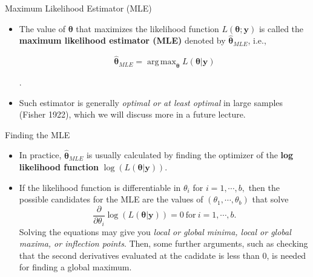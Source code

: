 \documentclass{beamer}
\DeclareMathOperator*{\argmax}{arg\,max}
\begin{document}
    \begin{frame}{Maximum Likelihood Estimator (MLE)}
        \begin{itemize}
            \item The value of $\boldsymbol{\theta}$ that maximizes the likelihood function $L(\boldsymbol{\theta}; \boldsymbol{y})$ is called the {\bf maximum likelihood estimator (MLE)} denoted by $\hat{\boldsymbol{\theta}}_{MLE}$, i.e.,
            
            $$\hat{\boldsymbol{\theta}}_{MLE} = \argmax_{\boldsymbol{\theta}} L(\boldsymbol{\theta}| \boldsymbol{y})$$
            
            .
            \item Such estimator is generally {\it optimal or at least optimal} in large samples (Fisher 1922), which we will discuss more in a future lecture.
        \end{itemize}
    \end{frame}
    
    \begin{frame}{Finding the MLE}
        \begin{itemize}
            \item In practice, $\hat{\boldsymbol{\theta}}_{MLE}$ is usually calculated by finding the optimizer of the {\bf log likelihood function} $\log(L(\boldsymbol{\theta}| \boldsymbol{y})).$
            
            \item If the likelihood function is differentiable in $\theta_{i}$ for $i = 1, \cdots, b,$  then the possible candidates for the MLE are the values of $(\theta_{1}, \cdots, \theta_{b})$ that solve 
             $$ \frac{\partial}{\partial \theta_{i}} \log(L(\boldsymbol{\theta}| \boldsymbol{y})) = 0\ \mbox{for}\ i = 1, \cdots, b.$$
             Solving the equations may give you {\it local or global minima, local or global maxima, or inflection points}. Then, some further arguments, such as checking that the second derivatives evaluated at the cadidate is less than 0, is needed for finding a global maximum.
        \end{itemize}
    \end{frame}
    
\end{document}
